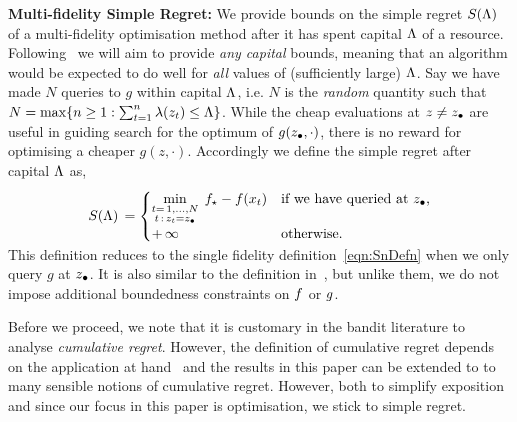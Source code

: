 \textbf{Multi-fidelity Simple Regret:}
We provide bounds on the simple regret $S(\Lambda)$ of a multi-fidelity optimisation method
after it has spent capital $\Lambda$ of a resource.
Following~\citet{srinivas10gpbandits,kandasamy16mfbo} we
will aim to provide \emph{any capital} bounds, meaning that an algorithm would be expected
to do well for \emph{all} values of (sufficiently large) $\Lambda$.
Say we have made $N$ queries to $g$ within capital $\Lambda$,
i.e. $N$ is the \emph{random} quantity such that
$N = \max\{n\geq 1: \sum_{t=1}^n \lambda(z_t) \leq \Lambda\}$.
While the cheap evaluations at $z\neq z_{\bullet}$ are useful in guiding search 
for the optimum of $g(z_{\bullet},\cdot)$, there is no reward for optimising a cheaper
$g(z,\cdot)$. Accordingly we define the simple regret after capital $\Lambda$ as,
\vspace{-0.02in}
\begin{align*}
S(\capital) \,=
\begin{cases}
\displaystyle\min_{\substack{t=\,1,\dots,N\\t\,:\,\zt = \zhf}}\;
  \funcopt - \func(\xt) %
    &\text{if we have queried at $\zhf$,} \\
+\,\infty & \text{otherwise.}
\end{cases}
\\[-0.15in]
\end{align*}
\vspace{-0.35in}

This definition reduces to the single fidelity definition~\eqref{eqn:SnDefn} when we only
query $g$ at $z_{\bullet}$.
It is also similar to the definition in~\citet{kandasamy16mfbo}, but unlike them, we do
not impose additional boundedness constraints on $f$ or $g$.

Before we proceed, we note that it is customary in the bandit literature to analyse
\emph{cumulative regret}. However, the definition of cumulative regret depends
on the
application at hand~\citep{kandasamy16mfbandit} and the results in this paper can be
extended to to many sensible notions of cumulative regret.
However, both to simplify exposition and since our focus in this paper is optimisation,
we stick to simple regret.

